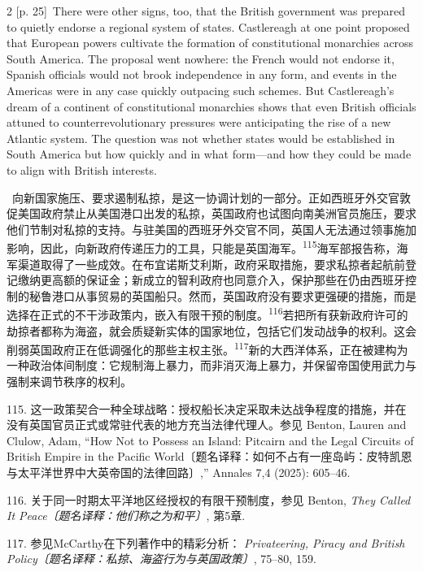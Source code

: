 \documentclass[10pt,a4paper]{article}
\begin{document}
\begin{paracol}{2}
\switchcolumn
{\scriptsize\color{gray} [p. 25]}\ There were other signs, too, that the British government was prepared to quietly endorse a regional system of states. Castlereagh at one point proposed that European powers cultivate the formation of constitutional monarchies across South America. The proposal went nowhere: the French would not endorse it, Spanish officials would not brook independence in any form, and events in the Americas were in any case quickly outpacing such schemes. But Castlereagh’s dream of a continent of constitutional monarchies shows that even British officials attuned to counterrevolutionary pressures were anticipating the rise of a new Atlantic system. The question was not whether states would be established in South America but how quickly and in what form—and how they could be made to align with British interests.\par
\switchcolumn*
{\scriptsize\color{gray} [p. 25]}\ 向新国家施压、要求遏制私掠，是这一协调计划的一部分。正如西班牙外交官敦促美国政府禁止从美国港口出发的私掠，英国政府也试图向南美洲官员施压，要求他们节制对私掠的支持。与驻美国的西班牙外交官不同，英国人无法通过领事施加影响，因此，向新政府传递压力的工具，只能是英国海\mbox{军。\textsuperscript{115}}海军部报告称，海军渠道取得了一些成效。在布宜诺斯艾利斯，政府采取措施，要求私掠者起航前登记缴纳更高额的保证金；新成立的智利政府也同意介入，保护那些在仍由西班牙控制的秘鲁港口从事贸易的英国船只。然而，英国政府没有要求更强硬的措施，而是选择在正式的不干涉政策内，嵌入有限干预的制\mbox{度。\textsuperscript{116}}若把所有获新政府许可的劫掠者都称为海盗，就会质疑新实体的国家地位，包括它们发动战争的权利。这会削弱英国政府正在低调强化的那些主权主\mbox{张。\textsuperscript{117}}新的大西洋体系，正在被建构为一种政治体间制度：它规制海上暴力，而非消灭海上暴力，并保留帝国使用武力与强制来调节秩序的权利。\par{\small 115. 这一政策契合一种全球战略：授权船长决定采取未达战争程度的措施，并在没有英国官员正式或常驻代表的地方充当法律代理人。参见 Benton, Lauren and Clulow, Adam, “How Not to Possess an Island: Pitcairn and the Legal Circuits of British Empire in the Pacific World〔题名译释：如何不占有一座岛屿：皮特凯恩与太平洋世界中大英帝国的法律回路〕,” Annales 7,4 (2025): 605–46.\par}{\small 116. 关于同一时期太平洋地区经授权的有限干预制度，参见 Benton, \textit{They Called It Peace〔题名译释：他们称之为和平〕}, 第5章.\par}{\small 117. 参见McCarthy在下列著作中的精彩分析： \textit{Privateering, Piracy and British Policy〔题名译释：私掠、海盗行为与英国政策〕}, 75–80, 159.\par}

\end{paracol}
\end{document}

